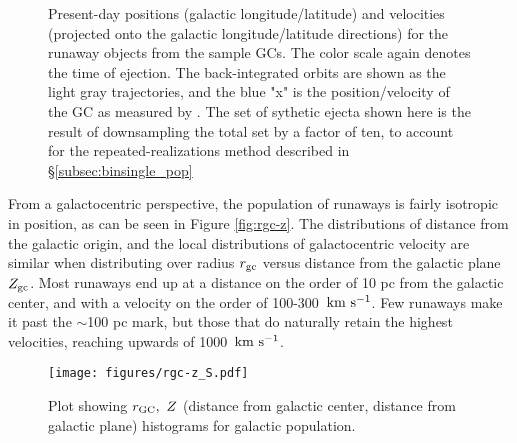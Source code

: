 \documentclass[twocolumn]{aastex631}
\newcommand{\kms}{${\rm km~s^{-1}}$}
\begin{document}
\begin{figure*}
    \caption{
        Present-day positions (galactic longitude/latitude) and velocities (projected onto the galactic longitude/latitude directions) for the runaway objects from the sample GCs.
        The color scale again denotes the time of ejection.
        The back-integrated orbits are shown as the light gray trajectories, and the blue "x" is the position/velocity of the GC as measured by \citet{2018MNRAS.478.1520B}.
        The set of sythetic ejecta shown here is the result of downsampling the total set by a factor of ten, to account for the repeated-realizations method described in \S\ref{subsec:binsingle_pop}
    }
    \label{fig:gcej_today}
\end{figure*}

From a galactocentric perspective, the population of runaways is fairly isotropic in position, as can be seen in Figure \ref{fig:rgc-z}.
The distributions of distance from the galactic origin, and the local distributions of galactocentric velocity are similar when distributing over radius $r_{\rm gc}$ versus distance from the galactic plane $Z_{\rm gc}$.
Most runaways end up at a distance on the order of 10 pc from the galactic center, and with a velocity on the order of 100-300~\kms.
Few runaways make it past the $\sim$100 pc mark, but those that do naturally retain the highest velocities, reaching upwards of 1000~\kms.

\begin{figure*}
    \begin{centering}
        \texttt{[image: figures/rgc-z\_S.pdf]}
        \caption{
            Plot showing $r_{\rm GC},\ Z$ (distance from galactic center, distance from galactic plane) histograms for galactic population.
        }
        \label{fig:rgc-z_hists}
    \end{centering}
\end{figure*}
\end{document}
